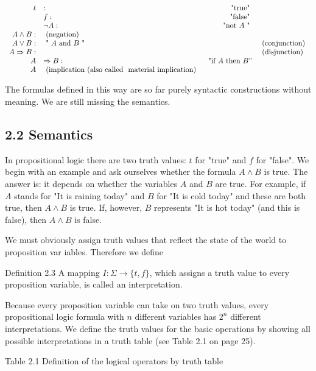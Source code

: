 \documentclass[10pt]{article}
\begin{document}
$$
\begin{array}{rlrl}
t & : & \text { "true" } & \\
& f: & \text { "false" } & \\
& \neg A: & \text { "not } A \text { " } & \\
A \wedge B: & \text { (negation) } \\
A \vee B: & \text { " } A \text { and } B \text { " } & & \text { (conjunction) } \\
A \Rightarrow B: & & & \text { (disjunction) } \\
A & \Rightarrow B: & \text { "if } A \text { then } B " & \\
A & \text { (implication (also called } \text { material implication) }
\end{array}
$$

The formulas defined in this way are so far purely syntactic constructions without meaning. We are still missing the semantics.

\subsection*{2.2 Semantics}
In propositional logic there are two truth values: $t$ for "true" and $f$ for "false". We begin with an example and ask ourselves whether the formula $A \wedge B$ is true. The answer is: it depends on whether the variables $A$ and $B$ are true. For example, if $A$ stands for "It is raining today" and $B$ for "It is cold today" and these are both true, then $A \wedge B$ is true. If, however, $B$ represents "It is hot today" (and this is false), then $A \wedge B$ is false.

We must obviously assign truth values that reflect the state of the world to proposition var
iables. Therefore we define

\begin{displayquote}
Definition 2.3 A mapping $I: \Sigma \rightarrow\{t, f\}$, which assigns a truth value to every proposition variable, is called an interpretation.
\end{displayquote}

Because every proposition variable can take on two truth values, every propositional logic formula with $n$ different variables has $2^{n}$ different interpretations. We define the truth values for the basic operations by showing all possible interpretations in a truth table (see Table 2.1 on page 25).

Table 2.1 Definition of the logical operators by truth table
\end{document}
